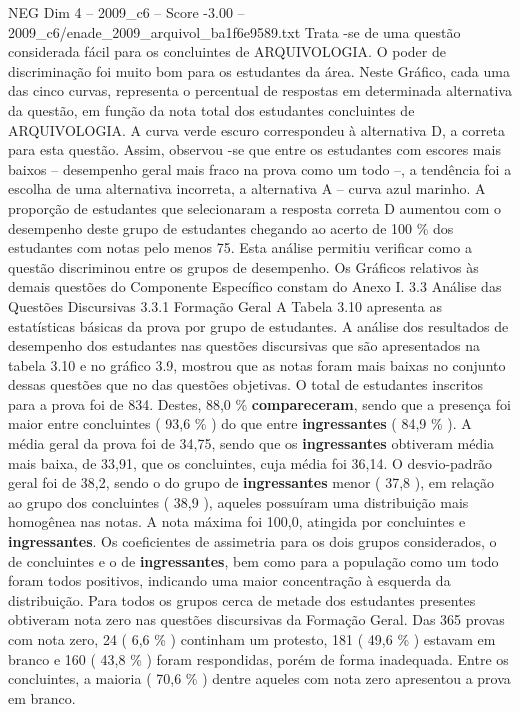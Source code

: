 \begin{textsample}{NEG Dim 4 – 2009\_c6 – Score -3.00 – 2009\_c6/enade\_2009\_arquivol\_ba1f6e9589.txt}
Trata -se de uma questão considerada fácil para os concluintes de ARQUIVOLOGIA.
O poder de discriminação foi muito bom para os estudantes da área.
Neste Gráfico, cada uma das cinco curvas, representa o percentual de respostas em determinada alternativa da questão, em função da nota total dos estudantes concluintes de ARQUIVOLOGIA.
A curva verde escuro correspondeu à alternativa D, a correta para esta questão.
Assim, observou -se que entre os estudantes com escores mais baixos – desempenho geral mais fraco na prova como um todo –, a tendência foi a escolha de uma alternativa incorreta, a alternativa A – curva azul marinho.
A proporção de estudantes que selecionaram a resposta correta D aumentou com o desempenho deste grupo de estudantes chegando ao acerto de 100 \% dos estudantes com notas pelo menos 75.
Esta análise permitiu verificar como a questão discriminou entre os grupos de desempenho.
Os Gráficos relativos às demais questões do Componente Específico constam do Anexo I. 3.3 Análise das Questões Discursivas 3.3.1 Formação Geral A Tabela 3.10 apresenta as estatísticas básicas da prova por grupo de estudantes.
A análise dos resultados de desempenho dos estudantes nas questões discursivas que são apresentados na tabela 3.10 e no gráfico 3.9, mostrou que as notas foram mais baixas no conjunto dessas questões que no das questões objetivas.
O total de estudantes inscritos para a prova foi de 834.
Destes, 88,0 \% \textbf{compareceram}, sendo que a presença foi maior entre concluintes ( 93,6 \% ) do que entre \textbf{ingressantes} ( 84,9 \% ).
A média geral da prova foi de 34,75, sendo que os \textbf{ingressantes} obtiveram média mais baixa, de 33,91, que os concluintes, cuja média foi 36,14.
O desvio-padrão geral foi de 38,2, sendo o do grupo de \textbf{ingressantes} menor ( 37,8 ), em relação ao grupo dos concluintes ( 38,9 ), aqueles possuíram uma distribuição mais homogênea nas notas.
A nota máxima foi 100,0, atingida por concluintes e \textbf{ingressantes}.
Os coeficientes de assimetria para os dois grupos considerados, o de concluintes e o de \textbf{ingressantes}, bem como para a população como um todo foram todos positivos, indicando uma maior concentração à esquerda da distribuição.
Para todos os grupos cerca de metade dos estudantes presentes obtiveram nota zero nas questões discursivas da Formação Geral.
Das 365 provas com nota zero, 24 ( 6,6 \% ) continham um protesto, 181 ( 49,6 \% ) estavam em branco e 160 ( 43,8 \% ) foram respondidas, porém de forma inadequada.
Entre os concluintes, a maioria ( 70,6 \% ) dentre aqueles com nota zero apresentou a prova em branco.

\end{textsample}
